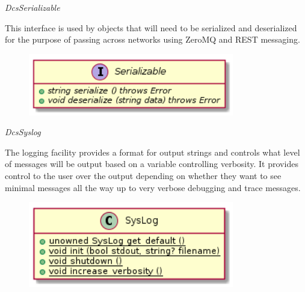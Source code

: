       \emph{DcsSerializable}

      \vspace*{-0.75cm}
      \begin{minipage}[t]{0.5\textwidth}
      	\vspace*{0.5cm}
        This interface is used by objects that will need to be serialized and
        deserialized for the purpose of passing across networks using ZeroMQ and
        REST messaging.
      \end{minipage} \hfill
      \begin{minipage}[t]{0.45\textwidth}
        \begin{figure}[H]
          \includegraphics[width=0.8\textwidth]{figures/design/class/core/serializable}
          \label{fig:dsg-classes-serializable}
        \end{figure}
      \end{minipage}

      \emph{DcsSyslog}

      \vspace*{-0.75cm}
      \begin{minipage}[t]{0.5\textwidth}
      	\vspace*{0.5cm}
        The logging facility provides a format for output strings and controls
        what level of messages will be output based on a variable controlling
        verbosity. It provides control to the user over the output depending on
        whether they want to see minimal messages all the way up to very
        verbose debugging and trace messages.
      \end{minipage} \hfill
      \begin{minipage}[t]{0.45\textwidth}
        \begin{figure}[H]
          \includegraphics[width=0.8\textwidth]{figures/design/class/core/syslog}
          \label{fig:dsg-classes-syslog}
        \end{figure}
      \end{minipage}

